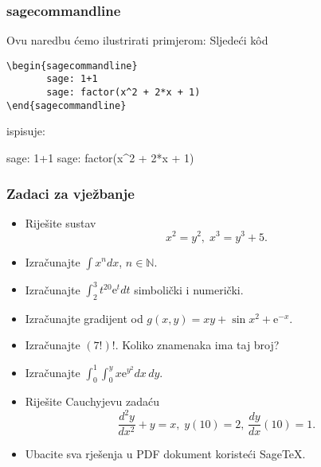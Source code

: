 \documentclass{beamer}
\begin{document}
\begin{frame}[fragile]\frametitle{sagecommandline}
Ovu naredbu ćemo ilustrirati primjerom:
Sljedeći k\^od
\begin{lstlisting}
\begin{sagecommandline}
       sage: 1+1
       sage: factor(x^2 + 2*x + 1)
\end{sagecommandline}
\end{lstlisting}
ispisuje:
\begin{sagecommandline}
       sage: 1+1
       sage: factor(x^2 + 2*x + 1)
\end{sagecommandline}
\end{frame}
\begin{frame}
\frametitle{Zadaci za vježbanje}
\begin{itemize}
\item Riješite sustav
\[x^2 = y^2, \; x^3=y^3+5. \]
\item Izračunajte $\int x^n dx$, $n\in\mathbb{N}$.
\item Izračunajte $\int_2^3 t^{20}\mathrm{e}^t dt$ simbolički i numerički.
\item Izračunajte gradijent od $g(x,y)=xy+\sin x^2 +\mathrm{e}^{-x}$.
\item Izračunajte $(7!)!$. Koliko znamenaka ima taj broj?
\item Izračunajte $\int_0^1 \int_0^y x\mathrm{e}^{y^2} dx\,dy$.
\item Riješite Cauchyjevu zadaću
\[ \frac{d^2 y}{dx^2}+y=x,\; y(10)=2,\, \frac{dy}{dx}(10)=1. \]
\item Ubacite sva rješenja u PDF dokument koristeći Sage\TeX.
\end{itemize}
\end{frame}
\end{document}
